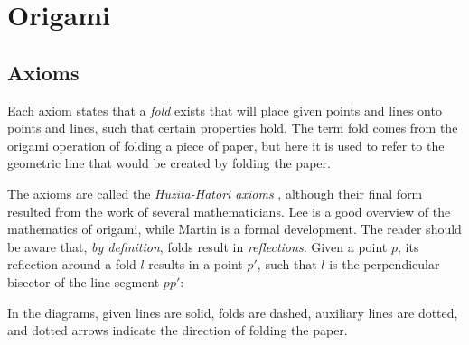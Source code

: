 
\part{Origami}\label{p.origami}

\chapter{Axioms}\label{c.axioms}

Each axiom states that a \emph{fold} exists that will place given points and lines onto points and lines, such that certain properties hold. The term fold comes from the origami operation of folding a piece of paper, but here it is used to refer to the geometric line that would be created by folding the paper.

The axioms are called the \emph{Huzita-Hatori axioms} \cite{wiki:hh}, although their final form resulted from the work of several mathematicians. Lee \cite[Chapter~4]{hwa} is a good overview of the mathematics of origami, while Martin \cite[Chapter~10]{martin} is a formal development. The reader should be aware that, \emph{by definition}, folds result in \emph{reflections}. Given a point $p$, its reflection around a fold $l$ results in a point $p'$, such that $l$ is the perpendicular bisector of the line segment $\overline{pp'}$:

\medskip

\begin{center}
\end{center}

\medskip

In the diagrams, given lines are solid, folds are dashed, auxiliary lines are dotted, and dotted arrows indicate the direction of folding the paper.

